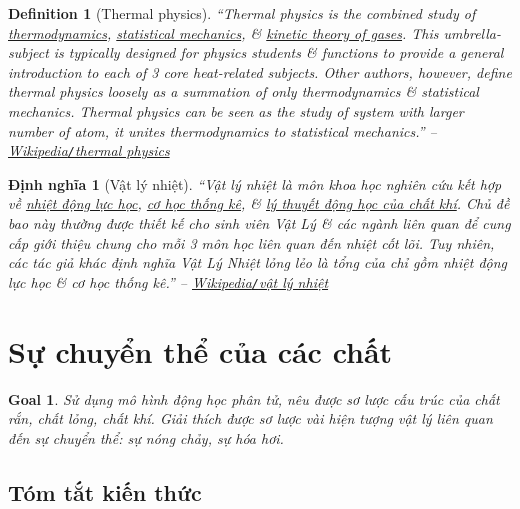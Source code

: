 \documentclass{article}
\newtheorem{definition}{Definition}
\newtheorem{dinhnghia}{Định nghĩa}
\newtheorem{goal}{Goal}
\begin{document}
\begin{definition}[Thermal physics]
	``{\rm Thermal physics} is the combined study of \href{https://en.wikipedia.org/wiki/Thermodynamics}{thermodynamics}, \href{https://en.wikipedia.org/wiki/Statistical_mechanics}{statistical mechanics}, \& \href{https://en.wikipedia.org/wiki/Kinetic_theory_of_gases}{kinetic theory of gases}. This umbrella-subject is typically designed for physics students \& functions to provide a general introduction to each of 3 core heat-related subjects. Other authors, however, define thermal physics loosely as a summation of only thermodynamics \& statistical mechanics. Thermal physics can be seen as the study of system with larger number of atom, it unites thermodynamics to statistical mechanics.'' -- \href{https://en.wikipedia.org/wiki/Thermal_physics}{Wikipedia{\tt/}thermal physics}
\end{definition}

\begin{dinhnghia}[Vật lý nhiệt]
	``{\rm Vật lý nhiệt} là môn khoa học nghiên cứu kết hợp về \href{https://vi.wikipedia.org/wiki/Nhi%E1%BB%87t_%C4%91%E1%BB%99ng_l%E1%BB%B1c_h%E1%BB%8Dc}{nhiệt động lực học}, \href{https://vi.wikipedia.org/wiki/C%C6%A1_h%E1%BB%8Dc_th%E1%BB%91ng_k%C3%AA}{cơ học thống kê}, \& \href{https://vi.wikipedia.org/wiki/Thuy%E1%BA%BFt_%C4%91%E1%BB%99ng_h%E1%BB%8Dc_ch%E1%BA%A5t_kh%C3%AD}{lý thuyết động học của chất khí}. Chủ đề bao này thường được thiết kế cho sinh viên Vật Lý \& các ngành liên quan để cung cấp giới thiệu chung cho mỗi 3 môn học liên quan đến nhiệt cốt lõi. Tuy nhiên, các tác giả khác định nghĩa Vật Lý Nhiệt lỏng lẻo là tổng của chỉ gồm nhiệt động lực học \& cơ học thống kê.'' -- \href{https://vi.wikipedia.org/wiki/V%E1%BA%ADt_l%C3%BD_nhi%E1%BB%87t}{Wikipedia{\tt/}vật lý nhiệt}
\end{dinhnghia}

\section{Sự chuyển thể của các chất}

\begin{goal}
	Sử dụng mô hình động học phân tử, nêu được sơ lược cấu trúc của chất rắn, chất lỏng, chất khí. Giải thích được sơ lược vài hiện tượng vật lý liên quan đến sự chuyển thể: sự nóng chảy, sự hóa hơi.
\end{goal}

\subsection{Tóm tắt kiến thức}
\end{document}
